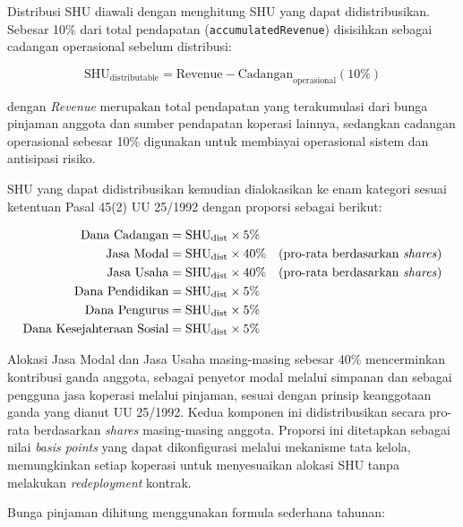 Distribusi SHU diawali dengan menghitung SHU yang dapat didistribusikan. Sebesar 10\% dari total pendapatan (\texttt{accumulatedRevenue}) disisihkan sebagai cadangan operasional sebelum distribusi:

\begin{equation}
\text{SHU}_{\text{distributable}} = \text{Revenue} - \text{Cadangan}_{\text{operasional}}(10\%)
\label{eq:shu-dist}
\end{equation}

\noindent dengan \textit{Revenue} merupakan total pendapatan yang terakumulasi dari bunga pinjaman anggota dan sumber pendapatan koperasi lainnya, sedangkan cadangan operasional sebesar 10\% digunakan untuk membiayai operasional sistem dan antisipasi risiko.

SHU yang dapat didistribusikan kemudian dialokasikan ke enam kategori sesuai ketentuan Pasal 45(2) UU 25/1992 dengan proporsi sebagai berikut:

\begin{equation}
\begin{aligned}
\text{Dana Cadangan} &= \text{SHU}_{\text{dist}} \times 5\% \\
\text{Jasa Modal} &= \text{SHU}_{\text{dist}} \times 40\% \quad \text{(pro-rata berdasarkan \textit{shares})} \\
\text{Jasa Usaha} &= \text{SHU}_{\text{dist}} \times 40\% \quad \text{(pro-rata berdasarkan \textit{shares})} \\
\text{Dana Pendidikan} &= \text{SHU}_{\text{dist}} \times 5\% \\
\text{Dana Pengurus} &= \text{SHU}_{\text{dist}} \times 5\% \\
\text{Dana Kesejahteraan Sosial} &= \text{SHU}_{\text{dist}} \times 5\%
\end{aligned}
\label{eq:shu-split}
\end{equation}

Alokasi Jasa Modal dan Jasa Usaha masing-masing sebesar 40\% mencerminkan kontribusi ganda anggota, sebagai penyetor modal melalui simpanan dan sebagai pengguna jasa koperasi melalui pinjaman, sesuai dengan prinsip keanggotaan ganda yang dianut UU 25/1992. Kedua komponen ini didistribusikan secara pro-rata berdasarkan \textit{shares} masing-masing anggota. Proporsi ini ditetapkan sebagai nilai \textit{basis points} yang dapat dikonfigurasi melalui mekanisme tata kelola, memungkinkan setiap koperasi untuk menyesuaikan alokasi SHU tanpa melakukan \textit{redeployment} kontrak.

Bunga pinjaman dihitung menggunakan formula sederhana tahunan:

